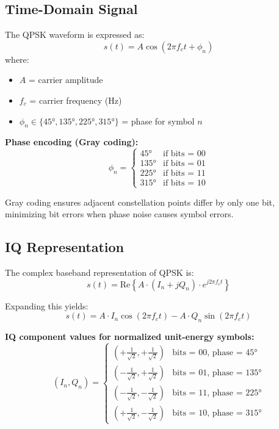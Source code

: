 \subsection{Time-Domain Signal}

The QPSK waveform is expressed as:
\begin{equation}
s(t) = A \cos(2\pi f_c t + \phi_n)
\end{equation}
where:
\begin{itemize}
\item $A$ = carrier amplitude
\item $f_c$ = carrier frequency (Hz)
\item $\phi_n \in \{45°, 135°, 225°, 315°\}$ = phase for symbol $n$
\end{itemize}

\textbf{Phase encoding (Gray coding):}
\begin{equation}
\phi_n = \begin{cases}
45° & \text{if bits = 00} \\
135° & \text{if bits = 01} \\
225° & \text{if bits = 11} \\
315° & \text{if bits = 10}
\end{cases}
\end{equation}

Gray coding ensures adjacent constellation points differ by only one bit, minimizing bit errors when phase noise causes symbol errors.

\subsection{IQ Representation}

The complex baseband representation of QPSK is:
\begin{equation}
s(t) = \mathrm{Re}\left\{A \cdot (I_n + jQ_n) \cdot e^{j2\pi f_c t}\right\}
\end{equation}

Expanding this yields:
\begin{equation}
s(t) = A \cdot I_n \cos(2\pi f_c t) - A \cdot Q_n \sin(2\pi f_c t)
\end{equation}

\textbf{IQ component values for normalized unit-energy symbols:}
\begin{equation}
(I_n, Q_n) = \begin{cases}
(+\frac{1}{\sqrt{2}}, +\frac{1}{\sqrt{2}}) & \text{bits = 00, phase = 45°} \\
(-\frac{1}{\sqrt{2}}, +\frac{1}{\sqrt{2}}) & \text{bits = 01, phase = 135°} \\
(-\frac{1}{\sqrt{2}}, -\frac{1}{\sqrt{2}}) & \text{bits = 11, phase = 225°} \\
(+\frac{1}{\sqrt{2}}, -\frac{1}{\sqrt{2}}) & \text{bits = 10, phase = 315°}
\end{cases}
\end{equation}


